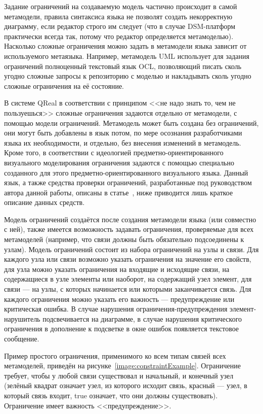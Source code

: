 Задание ограничений на создаваемую модель частично происходит в самой метамодели, 
правила синтаксиса языка не позволят создать некорректную диаграмму, если редактор строго 
им следует (что в случае \ac{DSM}-платформ практически всегда так, потому что редактор 
определяется метамоделью). Насколько сложные ограничения можно задать в метамодели 
языка зависит от используемого метаязыка. Например, метамодель UML использует для задания 
ограничений полноценный текстовый язык OCL, позволяющий писать сколь угодно сложные запросы 
к репозиторию с моделью и накладывать сколь угодно сложные ограничения на её состояние.

В системе QReal в соответствии с принципом <<не надо знать то, чем не пользуешься>> 
сложные ограничения задаются отдельно от метамодели, с помощью модели ограничений. 
Метамодель может быть создана без ограничений, они могут быть добавлены в язык потом,
по мере осознания разработчиками языка их необходимости, и отдельно, без внесения 
изменений в метамодель. Кроме того, в соответствии с идеологией предметно-ориентированного 
визуального моделирования ограничения задаются с помощью специально созданного для 
этого предметно-ориентированного визуального языка. Данный язык, а также средства 
проверки ограничений, разработанные под руководством автора данной работы, 
описаны в статье~\cite{deripaska2013constraints}, ниже приводится лишь краткое описание данных средств.

Модель ограничений создаётся после создания метамодели языка (или совместно с ней), 
также имеется возможность задавать ограничения, проверяемые для всех метамоделей (например, 
что связи должны быть обязательно подсоединены к узлам). Модель ограничений состоит 
из набора ограничений на узлы и связи. Для каждого узла или связи возможно указать 
ограничения на значение его свойств, для узла можно указать ограничения на входящие 
и исходящие связи, на содержащиеся в узле элементы или наоборот, на содержащий узел 
элемент, для связи --- на узлы, с которых начинается или которыми заканчивается связь. 
Для каждого ограничения можно указать его важность --- предупреждение или критическая 
ошибка. В случае нарушения ограничения-предупреждения элемент-нарушитель подсвечивается 
на диаграмме, в случае нарушения критического ограничения в дополнение к подсветке в 
окне ошибок появляется текстовое сообщение. 

Пример простого ограничения, применимого ко всем типам связей всех метамоделей, приведён 
на рисунке~\ref{image:constraintExample}. Ограничение требует, чтобы у любой связи существовал и начальный, и конечный 
узел (зелёный квадрат означает узел, из которого исходит связь, красный --- узел, в 
который связь входит, true означает, что они должны существовать). Ограничение имеет 
важность <<предупреждение>>.

